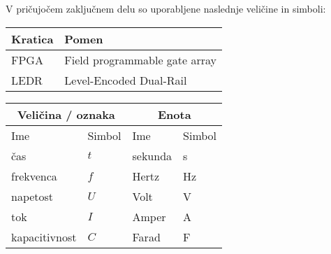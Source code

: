 \seznamsimbolovinkratic
V pričujočem zaključnem delu so uporabljene naslednje veličine in simboli:

\begin{center}
	\begin{tabular}{*{2}{l}} 
		\hline
		\bf{Kratica}        & \bf{Pomen}    					\\ 
		\hline
		FPGA                & Field programmable gate array		\\
		LEDR                & Level-Encoded Dual-Rail			\\
		\hline
	\end{tabular}
\end{center}

\begin{center}
	\begin{tabular}{*{4}{l}} \hline
		\multicolumn{2}{c}{\bf{Veličina / oznaka}}          & \multicolumn{2}{c}{\bf{Enota}} 	\\ 
		\hline
		Ime                & Simbol                         & Ime      			& Simbol              	\\ 
		\hline
		čas                & $t$                            & sekunda  			& s                   	\\
		frekvenca          & $f$                            & Hertz    			& Hz                  	\\
		napetost           & $U$                         	& Volt        		& V		            	\\
		tok                & $I$                            & Amper 			& A                  	\\
		kapacitivnost      & $C$                   			& Farad     		& F                   	\\
		\hline
	\end{tabular}
\end{center}



